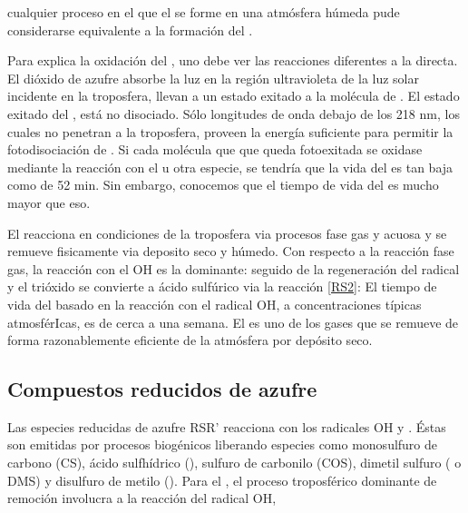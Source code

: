 cualquier proceso en el que el  se forme en una atmósfera húmeda pude considerarse equivalente a la formación del .

Para explica la oxidación del , uno debe ver las reacciones diferentes a la directa. El dióxido de azufre absorbe la luz en la región ultravioleta de  la luz solar incidente en la troposfera, llevan a un estado exitado a la molécula de .
El estado exitado del , está no disociado. S\'olo longitudes de onda debajo de los 218 nm, los cuales no penetran a la troposfera, proveen la energía suficiente para permitir la fotodisociación de . Si cada molécula que  que queda fotoexitada se oxidase mediante la reacción con el  u otra especie, se tendría que la vida del  es tan baja como de 52 min. Sin embargo, conocemos que el tiempo de vida del  es mucho mayor que eso.

El   reacciona en condiciones de la troposfera via procesos fase gas y acuosa y se remueve fisicamente via deposito seco y húmedo. Con respecto a la reacción fase gas, la reacción con el OH es la dominante:
seguido de la regeneración del radical 
y el trióxido se convierte a ácido sulfúrico via la reacción \ref{RS2}:
El tiempo de vida del  basado en la reacción con el radical OH, a concentraciones típicas atmosférIcas, es de cerca a una semana. El  es uno de los gases que se remueve de forma razonablemente eficiente de la atmósfera por depósito seco.

\subsection{Compuestos reducidos de azufre}\label{crso2}
Las especies reducidas de azufre  RSR' reacciona con los radicales OH y . Éstas son emitidas por procesos biogénicos liberando especies como monosulfuro de carbono (CS), ácido sulfhídrico (), sulfuro de carbonilo (COS), dimetil sulfuro ( o DMS) y disulfuro de metilo (). Para el , el proceso troposférico dominante de remoción involucra a la reacción del radical OH,


